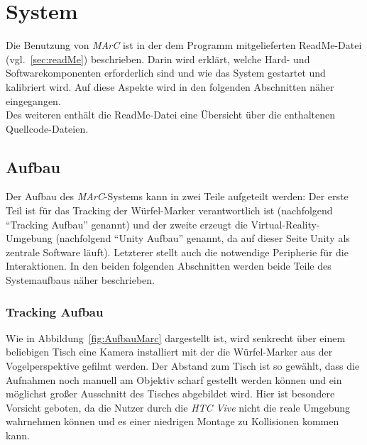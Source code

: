 
\section{System}\label{sec:system}
Die Benutzung von \textit{MArC} ist in der dem Programm mitgelieferten ReadMe-Datei (vgl.~\ref{sec:readMe}) beschrieben. Darin wird erklärt, welche Hard- und Softwarekomponenten erforderlich sind und wie das System gestartet und kalibriert wird. Auf diese Aspekte wird in den folgenden Abschnitten näher eingegangen.\\ 
Des weiteren enthält die ReadMe-Datei eine Übersicht über die enthaltenen Quellcode-Dateien.
\subsection{Aufbau}\label{sec:Aufbau}

Der Aufbau des \textit{MArC}-Systems kann in zwei Teile aufgeteilt werden: Der erste Teil ist für das Tracking der Würfel-Marker verantwortlich ist (nachfolgend "`Tracking Aufbau"' genannt) und der zweite erzeugt die Virtual-Reality-Umgebung (nachfolgend "`Unity Aufbau"' genannt, da auf dieser Seite Unity als zentrale Software läuft). Letzterer stellt auch die notwendige Peripherie für die Interaktionen. In den beiden folgenden Abschnitten werden beide Teile des Systemaufbaus näher beschrieben.

\subsubsection{Tracking Aufbau}
Wie in Abbildung~\ref{fig:AufbauMarc} dargestellt ist, wird senkrecht über einem beliebigen Tisch eine Kamera installiert mit der die Würfel-Marker aus der Vogelperspektive gefilmt werden. Der Abstand zum Tisch ist so gewählt, dass die Aufnahmen noch manuell am Objektiv scharf gestellt werden können und ein möglichst großer Ausschnitt des Tisches abgebildet wird. Hier ist besondere Vorsicht geboten, da die Nutzer durch die \textit{HTC Vive} nicht die reale Umgebung wahrnehmen können und es einer niedrigen Montage zu Kollisionen kommen kann. 

